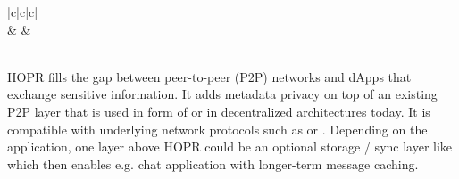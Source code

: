 \documentclass{article}
\newcommand{\MYhref}[3][blue]{\href{#2}{\color{#1}{#3}}}%
\begin{document}
\setlength{\tabcolsep}{1em} %
{\renewcommand{\arraystretch}{2}%
\begin{center}
    \begin{tabular}{|c|c|c|}
        \hline
         \\
        \hline
         &  & \\
        \hline
         \\
        \hline
    \end{tabular}
\end{center}
}

HOPR fills the gap between peer-to-peer (P2P) networks and dApps that exchange sensitive information. It adds metadata privacy on top of an existing P2P layer that is used in form of \MYhref{https://libp2p.io/}{libp2p} or \MYhref{https://en.wikipedia.org/wiki/WebRTC}{WebRTC} in decentralized architectures today. It is compatible with underlying network protocols such as \MYhref{https://en.wikipedia.org/wiki/Internet_protocol_suite}{TCP/IP} or \MYhref{https://en.wikipedia.org/wiki/QUIC}{QUIC}. Depending on the application, one layer above HOPR could be an optional storage / sync layer like \MYhref{https://matrix.org/}{Matrix} which then enables e.g. chat application with longer-term message caching.
\end{document}
